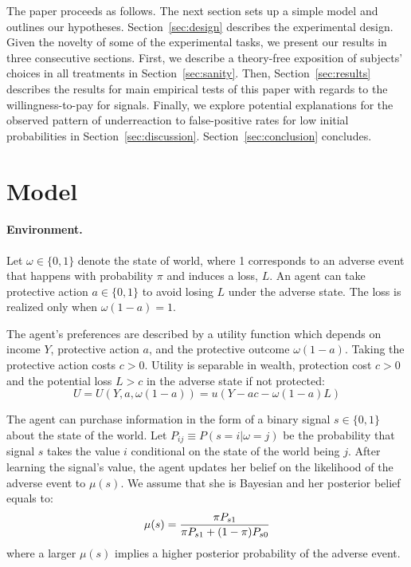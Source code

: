 \documentclass[12pt,a4paper]{article}
\begin{document}
The paper proceeds as follows. The next section sets up a simple model and outlines our hypotheses. Section~\ref{sec:design} describes the experimental design. Given the novelty of some of the experimental tasks, we present our results in three consecutive sections. First, we describe a theory-free exposition of subjects' choices in all treatments in Section~\ref{sec:sanity}. Then, Section~\ref{sec:results} describes the results for main empirical tests of this paper with regards to the willingness-to-pay for signals. Finally, we explore potential explanations for the observed pattern of underreaction to false-positive rates for low initial probabilities in Section~\ref{sec:discussion}. Section~\ref{sec:conclusion} concludes. 


\vspace{20pt}
\section{Model}\label{sec:model}
\paragraph{Environment.} Let $\omega \in \{0,1\}$ denote the state of world, where 1 corresponds to an adverse event that happens with probability $\pi$ and induces a loss, $L$. An agent can take protective action $a\in\{0,1\}$ to avoid losing $L$ under the adverse state. The loss is realized only when $\omega(1-a)=1$.

The agent's preferences are described by a utility function which depends on income $Y$, protective action $a$, and the protective outcome $\omega(1-a)$. Taking the protective action costs $c>0$. Utility is separable in wealth, protection cost $c>0$ and the potential loss $L>c$ in the adverse state if not protected:
\[
U=U(Y,a,\omega(1-a))=u(Y-ac-\omega(1-a)L)
\]

The agent can purchase information in the form of a binary signal $s\in\{0,1\}$ about the state of the world. Let $P_{ij}\equiv P(s=i|\omega=j)$ be the probability that signal $s$ takes the value $i$ conditional on the state of the world being $j$.  After learning the signal's value, the agent updates her belief on the likelihood of the adverse event to $\mu(s)$. We assume that she is Bayesian and her posterior belief equals to:
\[
\mu(s)= {\pi P_{s1} \over \pi P_{s1}+(1-\pi)P_{s0}}
\]
where a larger $\mu(s)$ implies a higher posterior probability of the adverse event.

\vspace{10pt}
\end{document}
